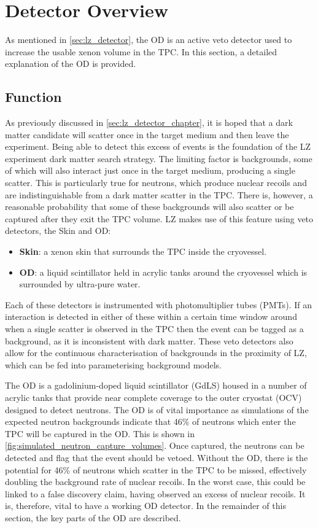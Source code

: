 \section{Detector Overview} \label{OD_detector_overview}
\par
As mentioned in \autoref{sec:lz_detector}, the OD is an active veto detector used to increase the usable xenon volume in the TPC.
In this section, a detailed explanation of the OD is provided.

\subsection{Function}
\par
As previously discussed in \autoref{sec:lz_detector_chapter}, it is hoped that a dark matter candidate will scatter once in the target medium and then leave the experiment.
Being able to detect this excess of events is the foundation of the LZ experiment dark matter search strategy.
The limiting factor is backgrounds, some of which will also interact just once in the target medium, producing a single scatter.
This is particularly true for neutrons, which produce nuclear recoils and are indistinguishable from a dark matter scatter in the TPC.
There is, however, a reasonable probability that some of these backgrounds will also scatter or be captured after they exit the TPC volume.
LZ makes use of this feature using veto detectors, the Skin and OD:
\begin{itemize}
    \item \textbf{Skin}: a xenon skin that surrounds the TPC inside the cryovessel.
    \item \textbf{OD}: a liquid scintillator held in acrylic tanks around the cryovessel which is surrounded by ultra-pure water.
\end{itemize}
Each of these detectors is instrumented with photomultiplier tubes (PMTs).
If an interaction is detected in either of these within a certain time window around when a single scatter is observed in the TPC then the event can be tagged as a background, as it is inconsistent with dark matter.
These veto detectors also allow for the continuous characterisation of backgrounds in the proximity of LZ, which can be fed into parameterising background models.

\par
The OD is a gadolinium-doped liquid scintillator (GdLS) housed in a number of acrylic tanks that provide near complete coverage to the outer cryostat (OCV) designed to detect neutrons.
The OD is of vital importance as simulations of the expected neutron backgrounds indicate that 46\% of neutrons which enter the TPC will be captured in the OD.
This is shown in \autoref{fig:simulated_neutron_capture_volumes}.
Once captured, the neutrons can be detected and flag that the event should be vetoed. 
Without the OD, there is the potential for 46\% of neutrons which scatter in the TPC to be missed, effectively doubling the background rate of nuclear recoils.
In the worst case, this could be linked to a false discovery claim, having observed an excess of nuclear recoils.
It is, therefore, vital to have a working OD detector.
In the remainder of this section, the key parts of the OD are described.

